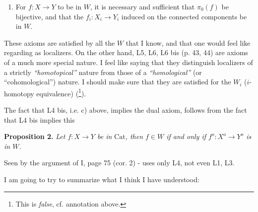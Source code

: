 \documentclass[11pt]{article}
\newcommand{\printedpage}[1]{\marginpar{\footnotesize p.~#1}}
\newcommand{\msp}[1]{\marginpar{\footnotesize [#1]}}
\newcommand{\Cat}{\mathrm{Cat}}
\begin{document}
\printedpage{29}

\begin{enumerate}[leftmargin=*]
\item[d)] For $f : X \longrightarrow Y$ to be in $W$, it is necessary and sufficient that $\pi_0(f)$ be bijective, and that the $f_i : X_i \longrightarrow Y_i$ induced on the connected components be in $W$.
\end{enumerate}

These axioms are satisfied by all the $W$ that I know, and that one would feel like regarding as localizers. On the other hand, L5, L6, L6 bis (p. 43, 44) are axioms of a much more special nature. I feel like saying that they distinguish localizers of a strictly \textit{``homotopical''} nature from those of a \textit{``homological''} (or ``cohomological'') nature. I should make sure that they are satisfied for the $W_i$ ($i$-homotopy equivalence) (\footnote[32]{This is \textit{false}, cf. annotation above.}). %

The fact that L4 bis, i.e. c) above, implies the dual axiom, follows from the fact that L4 bis implies this

\textbf{Proposition 2.} \textit{Let $f : X \longrightarrow Y$ be in} $\Cat$\textit{, then $f \in W$ if and only if $f^o : X^o \longrightarrow Y^o$ is in $W$.}

Seen by the argument of I, page 75 (cor. 2) - uses only L4, not even L1, L3.

\msp{page 46}

I am going to try to summarize what I think I have understood:
\end{document}
